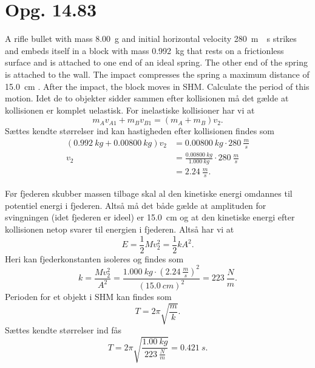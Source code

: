 \documentclass[12pt]{article}
\theoremstyle{definition}
\begin{document}
\section*{Opg. 14.83}
A rifle bullet with mass \qty{8,00}{g} and initial horizontal velocity \qty{280}{m \per s} strikes and embeds itself in a block with mass \qty{0,992}{kg} that rests on a frictionless surface and is attached to one end of an ideal spring. The other end of the spring is attached to the wall. The impact compresses the spring a maximum distance of \qty{15,0}{cm} . After the impact, the block moves in SHM. Calculate the period of this motion.
\bigbreak
Idet de to objekter sidder sammen efter kollisionen må det gælde at kollisionen er komplet uelastisk. For inelastiske kollisioner har vi at
\[ 
m_A v_{A1} + m_B v_{B1} = (m_A + m_B) v_{2}
.\]
Sættes kendte størrelser ind kan hastigheden efter kollisionen findes som
\begin{align*}
  (\qty{0,992}{kg} + \qty{0,00800}{kg}) v_2 &= \qty{0,00800}{kg} \cdot \qty{280}{\frac{m}{s}} \\
  v_2 &= \frac{\qty{0,00800}{kg}}{\qty{1,000}{kg}} \cdot \qty{280}{\frac{m}{s}} \\\ 
      &= \qty{2,24}{\frac{m}{s}} 
.\end{align*}

Før fjederen skubber massen tilbage skal al den kinetiske energi omdannes til potentiel energi i fjederen. Altså må det både gælde at amplituden for svingningen (idet fjederen er ideel) er \qty{15,0}{cm} og at den kinetiske energi efter kollisionen netop svarer til energien i fjederen. Altså har vi at
\[ 
E = \frac{1}{2}M v_2^2 = \frac{1}{2}k A^2
.\]
Heri kan fjederkonstanten isoleres og findes som
\[ 
  k = \frac{M v_2^2}{A^2} = \frac{\qty{1,000}{kg} \cdot \left( \qty{2,24}{\frac{m}{s}} \right)^2}{\left( \qty{15,0}{cm}  \right)^2 } =  \qty{223}{\frac{N}{m}} 
.\]
Perioden for et objekt i SHM kan findes som
\[ 
T = 2\pi \sqrt{\frac{m}{k}}
.\]
Sættes kendte størrelser ind fås
\[ 
T = 2\pi \sqrt{\frac{\qty{1,00}{kg}}{\qty{223}{\frac{N}{m}} }} = \qty{0,421}{s} 
.\]
\end{document}
